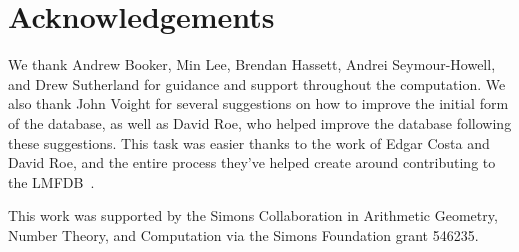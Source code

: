 \documentclass[11pt,reqno,oneside]{amsart}
\theoremstyle{plain}
\theoremstyle{definition}
\begin{document}
\section*{Acknowledgements}

We thank Andrew Booker, Min Lee, Brendan Hassett, Andrei Seymour-Howell, and
Drew Sutherland for guidance and support throughout the computation.
We also thank John Voight for several suggestions on how to improve the initial
form of the database, as well as David Roe, who helped improve the database
following these suggestions.
This task was easier thanks to the work of Edgar Costa and David Roe, and the
entire process they've helped create around contributing to the
LMFDB~\cite{costa2021zen}.

This work was supported by the Simons Collaboration in Arithmetic
Geometry, Number Theory, and Computation via the Simons Foundation grant
546235.




\end{document}
